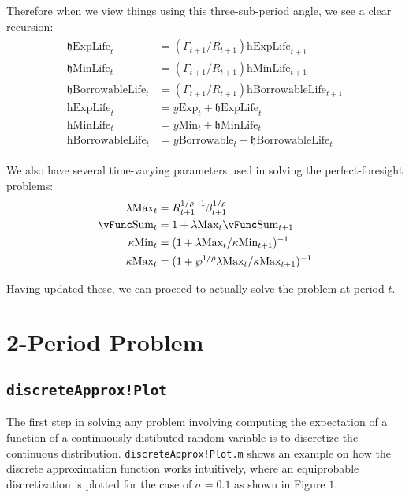 \documentclass[titlepage,abstract]{\econtex}
\providecommand{\lambdaMax}{\lambda\text{Max}}
\providecommand{\kappaMax}{\kappa\text{Max}}
\providecommand{\kappaMin}{\kappa\text{Min}}
\providecommand{\vSum}{\vFunc\text{Sum}}
\providecommand{\pUnem}{\wp}
\providecommand{\hExpLife}{\mathrm{h}\text{ExpLife}}
\providecommand{\hMinLife}{\mathrm{h}\text{MinLife}}
\providecommand{\hBorrowableLife}{\mathrm{h}\text{BorrowableLife}}
\providecommand{\hEndExpLife}{\mathfrak{h}\text{ExpLife}}
\providecommand{\hEndMinLife}{\mathfrak{h}\text{MinLife}}
\providecommand{\hEndBorrowableLife}{\mathfrak{h}\text{BorrowableLife}}
\providecommand{\yMin}{y\text{Min}}
\providecommand{\yBorrowable}{y\text{Borrowable}}
\providecommand{\yExp}{y\text{Exp}}
\begin{document}
Therefore when we view things using this three-sub-period angle, we see a clear recursion:
\begin{equation}\begin{gathered}\begin{aligned}
          \hEndExpLife_{t}  & =  (\Gamma_{t+1}/R_{t+1}) \hExpLife_{t+1} \\
          \hEndMinLife_{t}  & =  (\Gamma_{t+1}/R_{t+1}) \hMinLife_{t+1} \\
          \hEndBorrowableLife_{t}  & =  (\Gamma_{t+1}/R_{t+1}) \hBorrowableLife_{t+1} \\
          \hExpLife_{t}  & =  \yExp_{t} +\hEndExpLife_{t} \\
          \hMinLife_{t}  & =  \yMin_{t} +\hEndMinLife_{t} \\
          \hBorrowableLife_{t}  & =  \yBorrowable_{t} +\hEndBorrowableLife_{t}
\end{aligned}\end{gathered}\end{equation}

We also have several time-varying parameters used in solving the perfect-foresight problems:
          \begin{equation}\begin{gathered}\begin{aligned}
          \lambdaMax_{t}  & =  R_{t+1}^{1/\rho-1}\beta_{t+1}^{1/\rho} \\
          \vSum_{t}  & =  1+ \lambdaMax_{t} \vSum_{t+1} \\
          \kappaMin_{t}  & =  (1+\lambdaMax_{t}/\kappaMin_{t+1})^{-1} \\
          \kappaMax_{t}  & =  (1+\pUnem^{1/\rho}\lambdaMax_{t}/\kappaMax_{t+1})^{-1}
          \end{aligned}\end{gathered}\end{equation}

Having updated these, we can proceed to actually solve the problem at period $t$.
          
\section{2-Period Problem}
\subsection{\texttt{discreteApprox!Plot}}
The first step in solving any problem involving computing the expectation of a function of a continuously distibuted random variable is to discretize the continuous distribution. \texttt{discreteApprox!Plot.m} shows an example on how the discrete approximation function works intuitively, where an equiprobable discretization is plotted for the case of $\sigma= 0.1$ as shown in Figure $1$.
\end{document}
